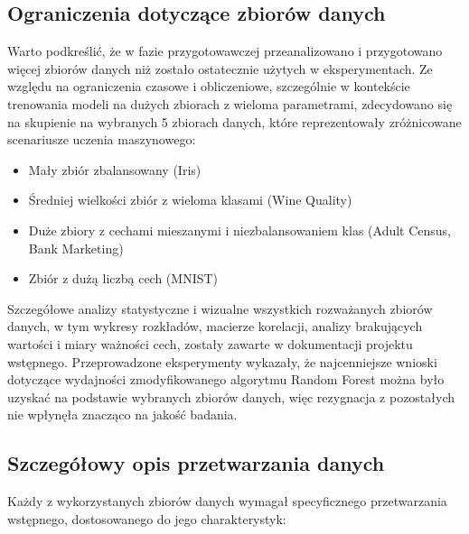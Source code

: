 \documentclass[11pt,a4paper]{article}
\begin{document}
\subsection{Ograniczenia dotyczące zbiorów danych}

Warto podkreślić, że w fazie przygotowawczej przeanalizowano i przygotowano więcej zbiorów danych niż zostało ostatecznie użytych w eksperymentach. Ze względu na ograniczenia czasowe i obliczeniowe, szczególnie w kontekście trenowania modeli na dużych zbiorach z wieloma parametrami, zdecydowano się na skupienie na wybranych 5 zbiorach danych, które reprezentowały zróżnicowane scenariusze uczenia maszynowego:

\begin{itemize}
    \item Mały zbiór zbalansowany (Iris)
    \item Średniej wielkości zbiór z wieloma klasami (Wine Quality)
    \item Duże zbiory z cechami mieszanymi i niezbalansowaniem klas (Adult Census, Bank Marketing)
    \item Zbiór z dużą liczbą cech (MNIST)
\end{itemize}

Szczegółowe analizy statystyczne i wizualne wszystkich rozważanych zbiorów danych, w tym wykresy rozkładów, macierze korelacji, analizy brakujących wartości i miary ważności cech, zostały zawarte w dokumentacji projektu wstępnego. Przeprowadzone eksperymenty wykazały, że najcenniejsze wnioski dotyczące wydajności zmodyfikowanego algorytmu Random Forest można było uzyskać na podstawie wybranych zbiorów danych, więc rezygnacja z pozostałych nie wpłynęła znacząco na jakość badania.

\subsection{Szczegółowy opis przetwarzania danych}

Każdy z wykorzystanych zbiorów danych wymagał specyficznego przetwarzania wstępnego, dostosowanego do jego charakterystyk:
\end{document}
